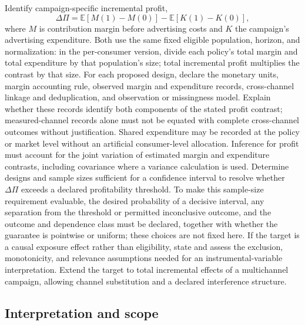 \documentclass[11pt,a4paper]{article}
\begin{document}
Identify campaign-specific incremental profit,
\[
\Delta\Pi=\mathbb E[M(1)-M(0)]-\mathbb E[K(1)-K(0)],
\]
where $M$ is contribution margin before advertising costs and $K$ the campaign's advertising expenditure. Both use the same fixed eligible population, horizon, and normalization: in the per-consumer version, divide each policy's total margin and total expenditure by that population's size; total incremental profit multiplies the contrast by that size. For each proposed design, declare the monetary units, margin accounting rule, observed margin and expenditure records, cross-channel linkage and deduplication, and observation or missingness model. Explain whether these records identify both components of the stated profit contrast; measured-channel records alone must not be equated with complete cross-channel outcomes without justification. Shared expenditure may be recorded at the policy or market level without an artificial consumer-level allocation. Inference for profit must account for the joint variation of estimated margin and expenditure contrasts, including covariance where a variance calculation is used. Determine designs and sample sizes sufficient for a confidence interval to resolve whether $\Delta\Pi$ exceeds a declared profitability threshold. To make this sample-size requirement evaluable, the desired probability of a decisive interval, any separation from the threshold or permitted inconclusive outcome, and the outcome and dependence class must be declared, together with whether the guarantee is pointwise or uniform; these choices are not fixed here. If the target is a causal exposure effect rather than eligibility, state and assess the exclusion, monotonicity, and relevance assumptions needed for an instrumental-variable interpretation. Extend the target to total incremental effects of a multichannel campaign, allowing channel substitution and a declared interference structure.

\subsection*{Interpretation and scope}
\end{document}
